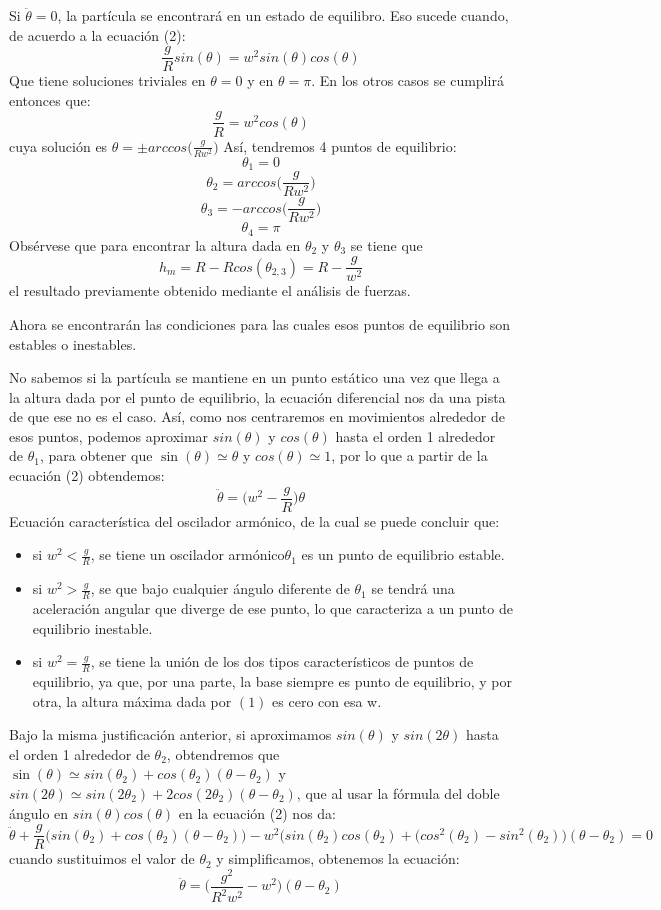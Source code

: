 \documentclass[12p]{article}
\begin{document}
Si $\ddot{\theta}=0$, la partícula se encontrará en un estado de equilibro. Eso sucede cuando, de acuerdo a la ecuación (2):
$$\frac{g}{R}sin(\theta)=w^2 sin(\theta)cos(\theta)$$
Que tiene soluciones triviales en $\theta=0$ y en $\theta=\pi$. En los otros casos se cumplirá entonces que:
$$\frac{g}{R}=w^2cos(\theta)$$
cuya solución es $\theta=\pm arccos\big(\frac{g}{Rw^2}\big)$
Así, tendremos 4 puntos de equilibrio:
$$\theta_{1}=0$$
$$\theta_{2}=arccos\Big(\frac{g}{Rw^2}\Big)$$
$$\theta_{3}=-arccos\Big(\frac{g}{Rw^2}\Big)$$
$$\theta_{4}=\pi$$
Obsérvese que para encontrar la altura dada en $\theta_{2}$ y $\theta_{3}$ se tiene que
$$h_{m}=R-Rcos(\theta_{2,3})=R-\frac{g}{w^2}$$
el resultado previamente obtenido mediante el análisis de fuerzas.

Ahora se encontrarán las condiciones para las cuales esos puntos de equilibrio son estables o inestables.

No sabemos si la partícula se mantiene en un punto estático una vez que llega a la altura dada por el punto de equilibrio, la ecuación diferencial nos da una pista de que ese no es el caso. Así, como nos centraremos en movimientos alrededor de esos puntos, podemos aproximar $sin(\theta)$ y $cos(\theta)$ hasta el orden 1 alrededor de $\theta_{1}$, para obtener que $\sin(\theta)\simeq \theta$ y $cos(\theta) \simeq 1$, por lo que a partir de la ecuación (2) obtendemos:
\begin{equation}
\ddot{\theta}=\Big(w^2-\frac{g}{R}\Big)\theta
\end{equation}
Ecuación característica del oscilador armónico, de la cual se puede concluir que:
\begin{itemize}
\item si $w^2 < \frac{g}{R}$, se tiene un oscilador armónico$\theta_{1}$ es un punto de equilibrio estable.
\item si $w^2 > \frac{g}{R}$, se que bajo cualquier ángulo diferente de $\theta_{1}$ se tendrá una aceleración angular que diverge de ese punto, lo que caracteriza a un punto de equilibrio inestable.
\item si $w^2 = \frac{g}{R}$, se tiene la unión de los dos tipos característicos de puntos de equilibrio, ya que, por una parte, la base siempre es punto de equilibrio, y por otra, la altura máxima dada por $(1)$ es cero con esa w.
\end{itemize}

Bajo la misma justificación anterior, si aproximamos $sin(\theta)$ y $sin(2\theta)$ hasta el orden 1 alrededor de $\theta_{2}$, obtendremos que $\sin(\theta)\simeq sin(\theta_{2})+cos(\theta_{2})(\theta-\theta_{2})$ y $sin(2\theta) \simeq sin(2\theta_{2})+2cos(2\theta_{2})(\theta-\theta_{2})$, que al usar la fórmula del doble ángulo en $sin(\theta)cos(\theta)$ en la ecuación (2) nos da:
$$\ddot{\theta}+\frac{g}{R}\big(sin(\theta_{2})+cos(\theta_{2})(\theta-\theta_{2})\big)-w^2\big(sin(\theta_{2})cos(\theta_{2})+(cos^2(\theta_{2})-sin^2(\theta_{2})\big)(\theta-\theta_{2})=0$$
cuando sustituimos el valor de $\theta_{2}$ y simplificamos, obtenemos la ecuación:
\begin{equation}
\ddot{\theta}=\Big(\frac{g^2}{R^2w^2}-w^2\Big)(\theta-\theta_{2})
\end{equation}
\end{document}
